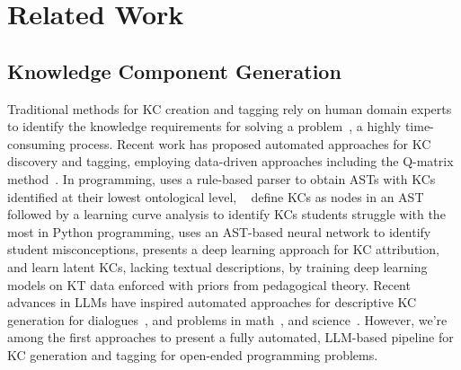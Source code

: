 \section{Related Work}



\subsection{Knowledge Component Generation} 

Traditional methods for KC creation and tagging rely on human domain experts to identify the knowledge requirements for solving a problem~\cite{bier2014approach}, a highly time-consuming process.
Recent work has proposed automated approaches for KC discovery and tagging, employing data-driven approaches including the Q-matrix method~\cite{barnes2005q}. 
In programming, \cite{hosseini2013javaparser} uses a rule-based parser to obtain ASTs with KCs identified at their lowest ontological level, ~\cite{rivers2016learning} define KCs as nodes in an AST followed by a learning curve analysis to identify KCs students struggle with the
most in Python programming, \cite{hoq2024towards} uses an AST-based neural network to identify student misconceptions, \cite{shi2024knowledge} presents a deep learning approach for KC attribution, and \cite{shi2023kc,shi2024knowledge} learn latent KCs, lacking textual descriptions, by training deep learning models on KT data enforced with priors from pedagogical theory.
Recent advances in LLMs have inspired automated approaches for descriptive KC generation for dialogues~\cite{scarlatos2024exploringknowledgetracingtutorstudent}, and problems in math~\cite{ozyurt2024automated}, and science~\cite{moore2024automated}. 
However, we're among the first approaches to present a fully automated, LLM-based pipeline for KC generation and tagging for open-ended programming problems.

